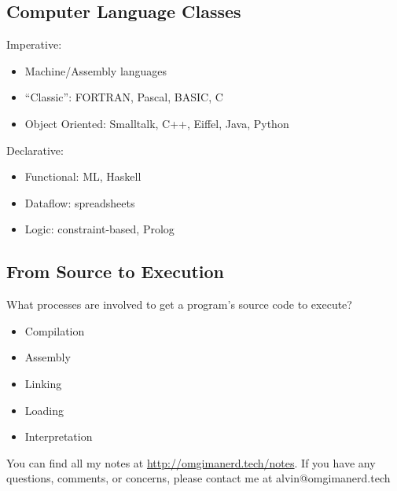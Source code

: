 \documentclass{math}
\begin{document}
\subsection*{Computer Language Classes}
Imperative:
\begin{itemize}
  \item Machine/Assembly languages
  \item ``Classic'': FORTRAN, Pascal, BASIC, C
  \item Object Oriented: Smalltalk, C++, Eiffel, Java, Python
\end{itemize}
Declarative:
\begin{itemize}
  \item Functional: ML, Haskell
  \item Dataflow: spreadsheets
  \item Logic: constraint-based, Prolog
\end{itemize}

\subsection*{From Source to Execution}
What processes are involved to get a program's source code to execute?
\begin{itemize}
  \item Compilation
  \item Assembly
  \item Linking
  \item Loading
  \item Interpretation
\end{itemize}

\begin{center}
  You can find all my notes at \url{http://omgimanerd.tech/notes}. If you have
  any questions, comments, or concerns, please contact me at
  alvin@omgimanerd.tech
\end{center}
\end{document}
